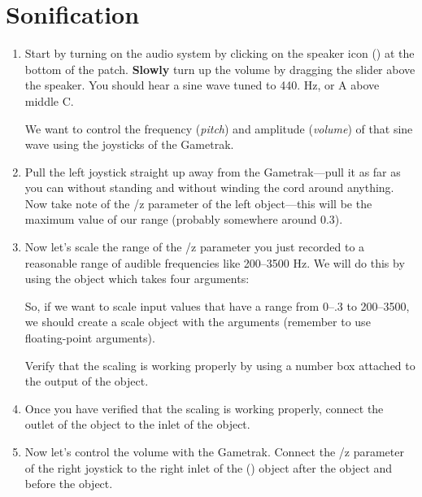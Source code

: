 \section{Sonification}

\begin{enumerate}
\item Start by turning on the audio system by clicking on the speaker icon 
() at the bottom of the patch.  \textbf{Slowly} turn up the volume by 
dragging the slider  above the speaker.  You should hear a sine wave 
tuned to 440. Hz, or A above middle C.

We want to control the frequency ({\em pitch}) and amplitude ({\em volume}) of that 
sine wave using the joysticks of the Gametrak.  

\item Pull the left joystick straight up away from the Gametrak---pull it as far 
as you can without standing and without winding the cord around anything.  
Now take note of the /z parameter of the left  object---this will 
be the maximum value of our range (probably somewhere around 0.3).

\item Now let's scale the range of the /z parameter you just recorded to 
a reasonable range of audible frequencies like 200--3500 Hz.  
We will do this by using the  
object which takes four arguments:
So, if we want to scale input values that have a range from 0--.3 to 200--3500, 
we should create a scale object with the arguments  
(remember to use floating-point arguments).

Verify that the scaling is working properly by using a number box attached to the 
output of the  object.


\item Once you have verified that the scaling is working properly, 
connect the outlet of the  object to the inlet of the  object.



\item Now let's control the volume with the Gametrak.  Connect the /z parameter of the 
right joystick to the right inlet of the \msp{*}{} () object after the 
object and before the  object.  



\end{enumerate}



